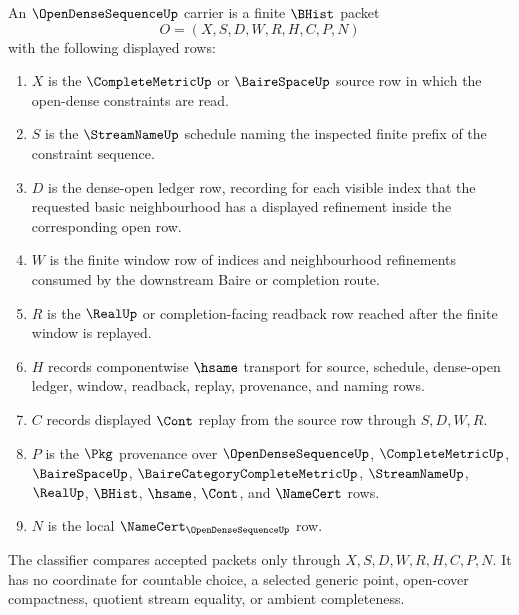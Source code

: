\begin{definition}
\label{def:open-dense-sequence-carrier}
An $\OpenDenseSequenceUp$ carrier is a finite $\BHist$ packet
$$
O=(X,S,D,W,R,H,C,P,N)
$$
with the following displayed rows:
\begin{enumerate}
\item $X$ is the $\CompleteMetricUp$ or $\BaireSpaceUp$ source row in which the open-dense constraints are read.
\item $S$ is the $\StreamNameUp$ schedule naming the inspected finite prefix of the constraint sequence.
\item $D$ is the dense-open ledger row, recording for each visible index that the requested basic neighbourhood has a displayed refinement inside the corresponding open row.
\item $W$ is the finite window row of indices and neighbourhood refinements consumed by the downstream Baire or completion route.
\item $R$ is the $\RealUp$ or completion-facing readback row reached after the finite window is replayed.
\item $H$ records componentwise $\hsame$ transport for source, schedule, dense-open ledger, window, readback, replay, provenance, and naming rows.
\item $C$ records displayed $\Cont$ replay from the source row through $S,D,W,R$.
\item $P$ is the $\Pkg$ provenance over $\OpenDenseSequenceUp$, $\CompleteMetricUp$, $\BaireSpaceUp$, $\BaireCategoryCompleteMetricUp$, $\StreamNameUp$, $\RealUp$, $\BHist$, $\hsame$, $\Cont$, and $\NameCert$ rows.
\item $N$ is the local $\NameCert_{\OpenDenseSequenceUp}$ row.
\end{enumerate}
The classifier compares accepted packets only through $X,S,D,W,R,H,C,P,N$. It has no coordinate for countable choice, a selected generic point, open-cover compactness, quotient stream equality, or ambient completeness.
\end{definition}

